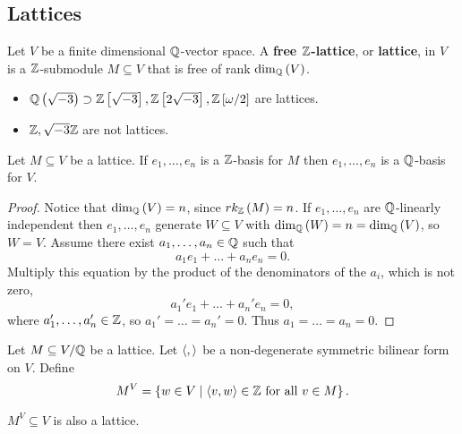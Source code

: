 \pagebreak

\subsection{Lattices}


\begin{definition}
Let $ V $ be a finite dimensional $ \mathbb{Q} $-vector space. A \textbf{free $ \mathbb{Z} $-lattice}, or \textbf{lattice}, in $ V $ is a $ \mathbb{Z} $-submodule $ M \subseteq V $ that is free of rank $ \dim_{\mathbb{Q}}\left( V \right) $.
\end{definition}

\begin{example*}
\hfill
\begin{itemize}
\item $ \mathbb{Q}\left( \sqrt{-3} \right) \supset \mathbb{Z}\left[ \sqrt{-3} \right], \mathbb{Z}\left[ 2\sqrt{-3} \right], \mathbb{Z}\left[ \omega / 2 \right] $ are lattices.
\item $ \mathbb{Z}, \sqrt{-3}\mathbb{Z} $ are not lattices.
\end{itemize}
\end{example*}

\begin{lemma}
Let $ M \subseteq V $ be a lattice. If $ e_1, \dots, e_n $ is a $ \mathbb{Z} $-basis for $ M $ then $ e_1, \dots, e_n $ is a $ \mathbb{Q} $-basis for $ V $.
\end{lemma}

\begin{proof}
Notice that $ \dim_{\mathbb{Q}}\left( V \right) = n $, since $ rk_{\mathbb{Z}}\left( M \right) = n $. If $ e_1, \dots, e_n $ are $ \mathbb{Q} $-linearly independent then $ e_1, \dots, e_n $ generate $ W \subseteq V $ with $ \dim_{\mathbb{Q}}\left( W \right) = n = \dim_{\mathbb{Q}}\left( V \right) $, so $ W = V $. Assume there exist $ a_1, \dots, a_n \in \mathbb{Q} $ such that
$$ a_1e_1 + \dots + a_ne_n = 0. $$
Multiply this equation by the product of the denominators of the $ a_i $, which is not zero,
$$ a_1'e_1 + \dots + a_n'e_n = 0, $$
where $ a_1', \dots, a_n' \in \mathbb{Z} $, so $ a_1' = \dots = a_n' = 0 $. Thus $ a_1 = \dots = a_n = 0 $.
\end{proof}

Let $ M \subseteq V / \mathbb{Q} $ be a lattice. Let $ \left\langle , \right\rangle $ be a non-degenerate symmetric bilinear form on $ V $. Define
$$ M^V = \left\{ w \in V \mid \left\langle v, w \right\rangle \in \mathbb{Z} \ \text{for all} \ v \in M \right\}. $$

\begin{proposition}
\label{prop:duallattice}
$ M^V \subseteq V $ is also a lattice.
\end{proposition}

